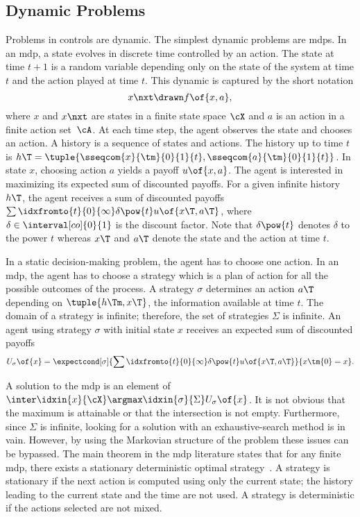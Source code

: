 \subsection{Dynamic Problems}
Problems in controls are dynamic.
The simplest dynamic problems are \acp{mdp}.
In an \ac{mdp}, a state evolves in discrete time controlled by an action.
The state at time \(t+1\) is a random variable depending only on the state of the system at time \(t\) and the action played at time \(t\).
This dynamic is captured by the short notation
\begin{equation}
\label{eq:mdp_dynamic}
x\nxt \drawn f \of {x, a},
\end{equation}
where \(x\) and \(x\nxt\) are states in a finite state space \(\cX\) and \(a\) is an action in a finite action set~\(\cA\).
At each time step, the agent observes the state and chooses an action.
A history is a sequence of states and actions.
The history up to time \(t\) is \(h\T = \tuple{\sseqcom{x}{\tm}{0}{1}{t}, \sseqcom{a}{\tm}{0}{1}{t}} \).
In state \(x\), choosing action \(a\) yields a payoff \(u \of {x, a}\).
The agent is interested in maximizing its expected sum of discounted payoffs.
For a given infinite history \(h\T\), the agent receives a sum of discounted payoffs \(\sum \idxfromto{t}{0}{\infty} \delta \pow {t} u \of {x\T, a\T}\), where \(\delta \in \interval[co]{0}{1}\) is the discount factor.
Note that \(\delta \pow {t}\) denotes \(\delta\) to the power \(t\) whereas \(x\T\) and \(a\T\) denote the state and the action at time \(t\).

In a static decision-making problem, the agent has to choose one action.
In an \ac{mdp}, the agent has to choose a strategy which is a plan of action for all the possible outcomes of the process.
A strategy \(\sigma\) determines an action \(a\T\) depending on \(\tuple{h\Tm, x\T}\), the information available at time \(t\).
The domain of a strategy is infinite; therefore, the set of strategies \(\Sigma\) is infinite.
An agent using strategy \(\sigma\) with initial state \(x\) receives an expected sum of discounted payoffs
\begin{equation}
\label{eq:mdp_optimal_strategy}
U\strat{\sigma} \of {x} = \expectcond[\sigma] {\sum \idxfromto{t}{0}{\infty} \delta \pow {t} u \of {x\T, a\T}} {x\tm{0} = x}.
\end{equation}

A solution to the \ac{mdp} is an element of \(\inter \idxin {x} {\cX} \argmax \idxin {\sigma} {\Sigma} U \strat{\sigma} \of {x}\).
It is not obvious that the maximum is attainable or that the intersection is not empty.
Furthermore, since \(\Sigma\) is infinite, looking for a solution with an exhaustive-search method is in vain.
However, by using the Markovian structure of the problem these issues can be bypassed.
The main theorem in the \ac{mdp} literature states that for any finite \ac{mdp}, there exists a stationary deterministic optimal strategy~\cite{puterman:1994,bertsekas:1995}.
A strategy is stationary if the next action is computed using only the current state; the history leading to the current state and the time are not used.
A strategy is deterministic if the actions selected are not mixed.

